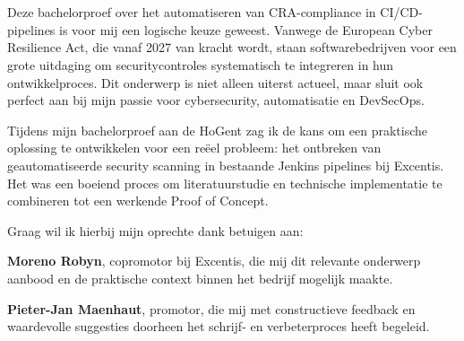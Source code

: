 
\chapter*{}%
\label{ch:voorwoord}


Deze bachelorproef over het automatiseren van CRA-compliance in CI/CD-pipelines is voor mij een logische keuze geweest. Vanwege de European Cyber Resilience Act, die vanaf 2027 van kracht wordt, staan softwarebedrijven voor een grote uitdaging om securitycontroles systematisch te integreren in hun ontwikkelproces. Dit onderwerp is niet alleen uiterst actueel, maar sluit ook perfect aan bij mijn passie voor cybersecurity, automatisatie en DevSecOps.

Tijdens mijn bachelorproef aan de HoGent  zag ik de kans om een praktische oplossing te ontwikkelen voor een reëel probleem: het ontbreken van geautomatiseerde security scanning in bestaande Jenkins pipelines bij Excentis. Het was een boeiend proces om literatuurstudie en technische implementatie te combineren tot een werkende Proof of Concept.

Graag wil ik hierbij mijn oprechte dank betuigen aan:

\textbf{Moreno Robyn}, copromotor bij Excentis, die mij dit relevante onderwerp aanbood en de praktische context binnen het bedrijf mogelijk maakte.

\textbf{Pieter-Jan Maenhaut}, promotor, die mij met constructieve feedback en waardevolle suggesties doorheen het schrijf- en verbeterproces heeft begeleid.

